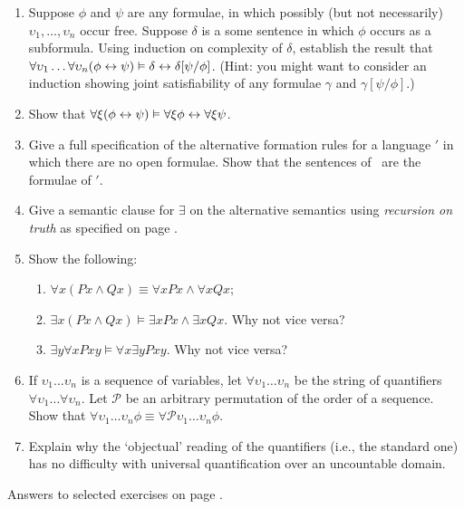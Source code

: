 {\begin{enumerate}
\begin{enumerate}
	\item If $\Gamma\vDash$ then $\Gamma[\tau/\theta]\vDash$.
\end{enumerate}
\item 	Suppose $\phi$ and $\psi$ are any formulae, in which possibly (but not necessarily) $\upsilon_{1},\ldots,\upsilon_{n}$ occur free. Suppose $\delta$ is a some sentence in which $\phi$ occurs as a subformula.  Using induction on complexity of $\delta$, establish the result that  $\forall\upsilon_{1}\ldots\forall\upsilon_{n}(\phi\leftrightarrow\psi)\vDash \delta \leftrightarrow \delta[\psi/\phi]$. (Hint: you might want to consider an induction showing joint satisfiability of any formulae $\gamma$ and $\gamma[\psi/\phi]$.)
\item Show that $\forall\xi(\phi\leftrightarrow\psi)\vDash\forall\xi\phi\leftrightarrow\forall\xi\psi$. 
\item Give a full specification of the alternative formation rules for a language \ltwo$'$ in which there are no open formulae. Show that the sentences of \ltwo\ are the formulae of \ltwo$'$.
\item Give a semantic clause for $\exists$ on the alternative semantics using \emph{recursion on truth} as specified on page \pageref{fiverectr}.
\item Show the following: \begin{enumerate}
	\item $\forall x (Px \wedge Qx) \equiv \forall x Px \wedge \forall x Qx$;
	\item $\exists x (Px \wedge Qx) \vDash \exists x Px \wedge \exists x Qx$. Why not vice versa?
	\item $\exists y \forall x Pxy \vDash \forall x \exists y Pxy$. Why not vice versa?
\end{enumerate}
\item If $\upsilon_{1}\ldots\upsilon_{n}$ is a sequence of variables, let $\forall \upsilon_{1}\ldots\upsilon_{n}$ be the string of quantifiers $\forall\upsilon_{1}\ldots\forall\upsilon_{n}$. Let $\mathcal{P}$ be an arbitrary permutation of the order of a sequence. Show that $\forall \upsilon_{1}\ldots\upsilon_{n} \phi \equiv \forall\mathcal{P}\upsilon_{1}\ldots\upsilon_{n} \phi$.
\item Explain why the `objectual' reading of the quantifiers (i.e., the standard one) has no difficulty with universal quantification over an uncountable domain.
\end{enumerate}

Answers to selected exercises on page \pageref{ans:l2}.
}







